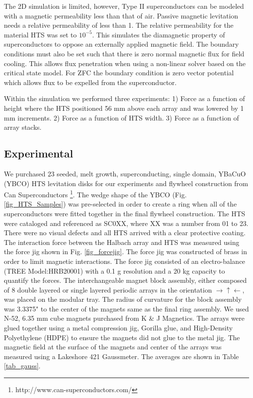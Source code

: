 The 2D simulation is limited, however, Type II superconductors can be modeled with a magnetic permeability less than that of air.  Passive magnetic levitation needs a relative permeability of less than 1.  The relative permeability for the material HTS was set to $10^{-5}$.  This simulates the diamagnetic property of superconductors to oppose an externally applied magnetic field.  The boundary conditions must also be set such that there is zero normal magnetic flux for field cooling.  This allows flux penetration when using a non-linear solver based on the critical state model.  For ZFC the boundary condition is zero vector potential which allows flux to be expelled from the superconductor.

Within the simulation we performed three experiments: 1) Force as a function of height where the HTS positioned 56 mm above each array and was lowered by 1 mm increments.  2) Force as a function of HTS width.  3) Force as a function of array stacks.

\subsection{Experimental}

We purchased 23 seeded, melt growth, superconducting, single domain, YBaCuO (YBCO)  HTS levitation disks for our experiments and flywheel construction from Can Superconductors \footnote{http://www.can-superconductors.com/}.  The wedge shape of the YBCO (Fig. \ref{fig_HTS_Samples}) was pre-selected in order to create a ring when all of the superconductors were fitted together in the final flywheel construction. The HTS were cataloged and referenced as SC0XX, where XX was a number from 01 to 23.  There were no visual defects and all HTS arrived with a clear protective coating. The interaction force between the Halbach array and HTS was measured using the force jig shown in Fig. \ref{fig_forcejig}.  The force jig was constructed of brass in order to limit magnetic interactions.  The force jig consisted of an electro-balance (TREE Model:HRB20001) with a 0.1 g resolution and a 20 kg capacity to quantify the forces.  The interchangeable magnet block assembly, either composed of 8 double layered or single layered periodic arrays in the orientation  $\rightarrow \uparrow \leftarrow$, was placed on the modular tray. The radius of curvature for the block assembly was 3.3375" to the center of the magnets same as the final ring assembly.  We used N-52, 6.35 mm cube magnets purchased from K \& J Magnetics.  The arrays were glued together using a metal compression jig, Gorilla glue, and High-Density Polyethylene (HDPE) to ensure the magnets did not glue to the metal jig. The magnetic field at the surface of the magnets and center of the arrays was measured using a Lakeshore 421 Gaussmeter.  The averages are shown in Table \ref{tab_gauss}.

